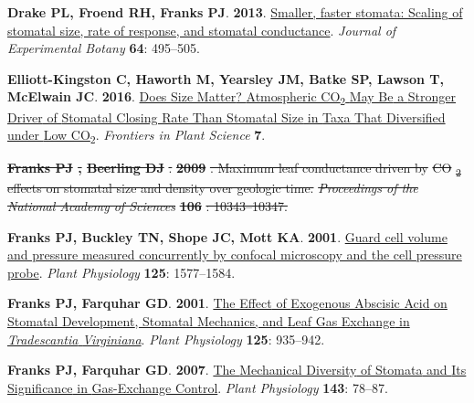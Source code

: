 \documentclass[
  letterpaper,
  DIV=11,
  numbers=noendperiod]{scrartcl}
\newlength{\cslhangindent}
\newenvironment{CSLReferences}[2] %
 {\begin{list}{}{%
  \setlength{\itemindent}{0pt}
  \setlength{\leftmargin}{0pt}
  \setlength{\parsep}{0pt}
  \ifodd #1
   \setlength{\leftmargin}{\cslhangindent}
   \setlength{\itemindent}{-1\cslhangindent}
  \fi
  \setlength{\itemsep}{#2\baselineskip}}}
 {\end{list}}
\providecommand{\DIFdeltex}[1]{{\protect\color{red}\sout{#1}}}                      %
\providecommand{\DIFaddend}{} %
\providecommand{\DIFdelbegin}{} %
\providecommand{\DIFdelend}{} %
\providecommand{\DIFdel}[1]{\texorpdfstring{\DIFdeltex{#1}}{}} %
\newcommand{\DIFscaledelfig}{0.5}
\newlength{\DIFdelgraphicswidth} %
\newlength{\DIFdelgraphicsheight} %
\newcommand{\DIFdelincludegraphics}[2][]{%
\sbox{\DIFdelgraphicsbox}{\DIFOincludegraphics[#1]{#2}}%
\settoboxwidth{\DIFdelgraphicswidth}{\DIFdelgraphicsbox} %
\settoboxtotalheight{\DIFdelgraphicsheight}{\DIFdelgraphicsbox} %
\scalebox{\DIFscaledelfig}{%
\parbox[b]{\DIFdelgraphicswidth}{\usebox{\DIFdelgraphicsbox}\\[-\baselineskip] \rule{\DIFdelgraphicswidth}{0em}}\llap{\resizebox{\DIFdelgraphicswidth}{\DIFdelgraphicsheight}{%
\setlength{\unitlength}{\DIFdelgraphicswidth}%
\begin{picture}(1,1)%
\thicklines\linethickness{2pt} %
{\color[rgb]{1,0,0}\put(0,0){\framebox(1,1){}}}%
{\color[rgb]{1,0,0}\put(0,0){\line( 1,1){1}}}%
{\color[rgb]{1,0,0}\put(0,1){\line(1,-1){1}}}%
\end{picture}%
}\hspace*{3pt}}} %
} %
\DeclareRobustCommand{\DIFaddend}{\DIFOaddend \let\includegraphics\DIFOincludegraphics} %
\DeclareRobustCommand{\DIFdelbegin}{\DIFOdelbegin \let\includegraphics\DIFdelincludegraphics} %
\DeclareRobustCommand{\DIFdelend}{\DIFOaddend \let\includegraphics\DIFOincludegraphics} %
\begin{document}
\begin{CSLReferences}{0}{1}
\DIFaddend {}
\textbf{\textbf{Drake PL}, \textbf{Froend RH}, \textbf{Franks PJ}}.
\textbf{2013}. \href{https://doi.org/10.1093/jxb/ers347}{Smaller, faster
stomata: Scaling of stomatal size, rate of response, and stomatal
conductance}. \emph{Journal of Experimental Botany} \textbf{64}:
495--505.

\textbf{\textbf{Elliott-Kingston C}, \textbf{Haworth M},
\textbf{Yearsley JM}, \textbf{Batke SP}, \textbf{Lawson T},
\textbf{McElwain JC}}. \textbf{2016}.
\href{https://doi.org/10.3389/fpls.2016.01253}{Does {Size Matter}?
{Atmospheric CO}{\textsubscript{2}} {May Be} a {Stronger Driver} of
{Stomatal Closing Rate Than Stomatal Size} in {Taxa That Diversified}
under {Low CO}{\textsubscript{2}}}. \emph{Frontiers in Plant Science}
\textbf{7}.

\DIFdelbegin {}
\textbf{\textbf{\DIFdel{Franks PJ}}%
\DIFdel{, }\textbf{\DIFdel{Beerling DJ}}%
}%
\DIFdel{. }\textbf{\DIFdel{2009}}%
\DIFdel{.
Maximum leaf conductance driven by }%
\DIFdel{CO}%
\DIFdel{\textsubscript{2}}%
\DIFdel{effects on
stomatal size and density over geologic time. }\emph{\DIFdel{Proceedings of the
National Academy of Sciences}} %
\textbf{\DIFdel{106}}%
\DIFdel{: 10343--10347.
}%

\DIFdelend {}
\textbf{\textbf{Franks PJ}, \textbf{Buckley TN}, \textbf{Shope JC},
\textbf{Mott KA}}. \textbf{2001}.
\href{https://doi.org/10.1104/pp.125.4.1577}{Guard cell volume and
pressure measured concurrently by confocal microscopy and the cell
pressure probe}. \emph{Plant Physiology} \textbf{125}: 1577--1584.

\textbf{\textbf{Franks PJ}, \textbf{Farquhar GD}}. \textbf{2001}.
\href{https://doi.org/10.1104/pp.125.2.935}{The {Effect} of {Exogenous
Abscisic Acid} on {Stomatal Development}, {Stomatal Mechanics}, and
{Leaf Gas Exchange} in {\emph{Tradescantia}}{ \emph{Virginiana}}}.
\emph{Plant Physiology} \textbf{125}: 935--942.

\textbf{\textbf{Franks PJ}, \textbf{Farquhar GD}}. \textbf{2007}.
\href{https://doi.org/10.1104/pp.106.089367}{The {Mechanical Diversity}
of {Stomata} and {Its Significance} in {Gas-Exchange Control}}.
\emph{Plant Physiology} \textbf{143}: 78--87.


\end{CSLReferences}
\end{document}
